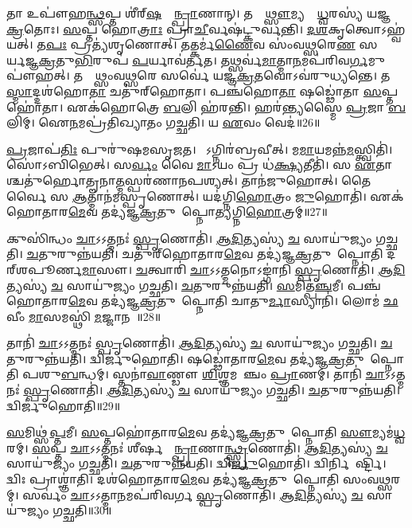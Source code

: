 𑌤𑌾 𑌉𑌪𑍗॑𑌹\ul{𑌨𑍍𑌥𑍍𑌸}𑌪𑍍𑌤 𑌶𑍀॑𑌰𑍍‌\mbox{}\ul{𑌷}𑌣𑍍𑌯𑌾᳚\ul{𑌨𑍍𑌪𑍍𑌰𑌾}𑌣𑌾𑌨𑍍।
𑌤𑌸𑍍𑌮𑌾᳚\ul{𑌥𑍍𑌸𑍗}𑌮𑍍𑌯𑌸𑍍𑌯𑌾᳚\ul{𑌧𑍍𑌵}𑌰𑌸𑍍𑌯॑ 𑌯𑌜𑍍𑌞\ul{𑌕𑍍𑌰}𑌤𑍋𑌃।
\ul{𑌸}𑌪𑍍𑌤 𑌹𑍋\ul{𑌤𑍍𑌰𑌾𑌃} 𑌪𑍍𑌰𑌾\ul{𑌚𑍀}𑌰𑍍𑌵𑌷॑𑌟𑍍𑌕𑍁𑌰𑍍𑌵𑌨𑍍𑌤𑌿।
\ul{𑌦}\ul{𑌶}𑌕𑍃𑌤𑍍𑌵𑍋\-𑌽𑌹𑍍𑌵॑𑌯𑌤𑍍।
𑌤\ul{𑌪𑌃} 𑌪𑍍𑌰𑌤𑍍𑌯॑𑌶𑍃𑌣𑍋𑌤𑍍।
𑌤𑌤𑍍𑌕𑌰𑍍𑌮॑\ul{𑌣𑍈}𑌵 𑌸𑌂॑𑌵\ul{𑌥𑍍𑌸}𑌰𑍇\ul{𑌣} 𑌸𑌰𑍍𑌵𑍈᳚𑌰𑍍𑌯𑌜𑍍𑌞\ul{𑌕𑍍𑌰}𑌤𑍁\ul{𑌭𑌿}𑌰𑍁𑌪॑ \ul{𑌪}𑌰𑍍𑌯𑌾𑌵॑𑌰𑍍𑌤𑌤।
𑌤𑌥𑍍𑌸𑌰𑍍𑌵॑\ul{𑌮𑌾}𑌤𑍍𑌮𑌾\ul{𑌨}𑌮𑌪॑𑌰𑌿𑌵\ul{𑌰𑍍𑌗}𑌮𑍁𑌪𑍗॑𑌹𑌤𑍍।
𑌤𑌸𑍍𑌮𑌾᳚𑌥𑍍𑌸𑌂𑌵\ul{𑌥𑍍𑌸}𑌰𑍇 𑌸𑌰𑍍𑌵𑍇॑ 𑌯𑌜𑍍𑌞\ul{𑌕𑍍𑌰}𑌤𑌵𑍋\-𑌽𑌵॑𑌰𑍁𑌧𑍍𑌯𑌨𑍍𑌤𑍇।
𑌤\ul{𑌸𑍍𑌮𑌾}𑌦𑍍𑌦𑌶॑𑌹𑍋\ul{𑌤𑌾} 𑌚𑌤𑍁॑𑌰𑍍‌\mbox{}𑌹𑍋𑌤𑌾।
𑌪𑌞𑍍𑌚॑𑌹𑍋\ul{𑌤𑌾} 𑌷𑌡𑍍𑌢𑍋॑𑌤𑌾 \ul{𑌸}𑌪𑍍𑌤𑌹𑍋॑𑌤𑌾।
𑌏𑌕॑𑌹𑍋𑌤𑍍𑌰𑍇 \ul{𑌬}𑌲𑌿 𑌹॑𑌰𑌨𑍍𑌤𑌿।
𑌹𑌰॑𑌨𑍍𑌤𑍍𑌯𑌸𑍍𑌮𑍈 \ul{𑌪𑍍𑌰}𑌜𑌾 \ul{𑌬}𑌲𑌿𑌮𑍍।
𑌐\ul{𑌨}𑌮𑌪𑍍𑌰॑𑌤𑌿𑌖𑍍𑌯𑌾𑌤𑌂 𑌗𑌚𑍍𑌛𑌤𑌿।
𑌯 \ul{𑌏}𑌵𑌂 𑌵𑍇𑌦॑॥26॥\anuvakamend[\ul{𑌚}𑌨𑍍𑌦𑍍𑌰𑌮𑌾᳚𑌶𑍍𑌚𑌾𑌤𑍁\ul{𑌰𑍍𑌮𑌾}𑌸𑍍𑌯𑌾𑌨𑌾𑌂᳚ 𑌯𑌜𑍍𑌞\ul{𑌕𑍍𑌰}𑌤𑍋𑌰॑\ul{𑌧𑍍𑌵}𑌰𑍇𑌣॑ 𑌯𑌜𑍍𑌞\ul{𑌕𑍍𑌰}𑌤𑍁𑌨𑍋𑌪॑ \ul{𑌪}𑌰𑍍𑌯𑌾𑌵॑𑌰𑍍𑌤𑌨𑍍𑌤 \ul{𑌸}𑌪𑍍𑌤𑌹𑍋॑𑌤𑌾 \ul{𑌚}𑌤𑍍𑌵𑌾𑌰𑌿॑ 𑌚]

\ul{𑌪𑍍𑌰}𑌜𑌾𑌪॑\ul{𑌤𑌿𑌃} 𑌪𑍁𑌰𑍁॑𑌷𑌮𑌸𑍃𑌜𑌤।
𑌸𑍋᳚𑌽𑌗𑍍𑌨𑌿𑌰॑𑌬𑍍𑌰𑌵𑍀𑌤𑍍।
𑌮\ul{𑌮𑌾}𑌯𑌮𑌨𑍍𑌨॑\-\ul{𑌮}𑌸𑍍𑌤𑍍𑌵𑌿𑌤𑌿॑।
𑌸𑍋॑𑌽𑌬𑌿𑌭𑍇𑌤𑍍।
𑌸\ul{𑌰𑍍𑌵𑌂} 𑌵𑍈 \ul{𑌮𑌾}𑌽𑌯𑌂 𑌪𑍍𑌰 𑌧॑\ul{𑌕𑍍𑌷𑍍𑌯}𑌤𑍀𑌤𑌿॑।
𑌸 \ul{𑌏}𑌤𑌾𑌶𑍍𑌚𑌤𑍁॑𑌰𑍍\mbox{}𑌹𑍋𑌤𑍄𑌨𑌾\ul{𑌤𑍍𑌮}𑌸𑍍𑌪𑌰॑𑌣𑌾𑌨𑌪𑌶𑍍𑌯𑌤𑍍।
𑌤𑌾𑌨॑𑌜𑍁𑌹𑍋𑌤𑍍।
𑌤𑍈𑌰𑍍𑌵𑍈 𑌸 \ul{𑌆}𑌤𑍍𑌮𑌾𑌨॑𑌮𑌸𑍍𑌪𑍃𑌣𑍋𑌤𑍍।
𑌯𑌦॑𑌗𑍍𑌨𑌿\ul{𑌹𑍋}𑌤𑍍𑌰𑌂 \ul{𑌜𑍁}𑌹𑍋𑌤𑌿॑।
𑌏𑌕॑𑌹𑍋𑌤𑌾𑌰\ul{𑌮𑍇}𑌵 𑌤𑌦𑍍𑌯॑𑌜𑍍𑌞\ul{𑌕𑍍𑌰}𑌤𑍁𑌮𑌾᳚𑌪𑍍𑌨𑍋𑌤𑍍𑌯𑌗𑍍𑌨𑌿\ul{𑌹𑍋}𑌤𑍍𑌰𑌮𑍍॥27॥

𑌕𑍁𑌸𑌿॑𑌨𑍍𑌧𑌂 \ul{𑌚𑌾}𑌽𑌽𑌤𑍍𑌮𑌨𑌃॑ \ul{𑌸𑍍𑌪𑍃}𑌣𑍋𑌤𑌿॑।
\ul{𑌆}\ul{𑌦𑌿}𑌤𑍍𑌯𑌸𑍍𑌯॑ \ul{𑌚} 𑌸𑌾𑌯𑍁॑𑌜𑍍𑌯𑌂 𑌗𑌚𑍍𑌛𑌤𑌿।
\ul{𑌚}𑌤𑍁𑌰𑍁𑌨𑍍𑌨॑𑌯𑌤𑌿।
𑌚𑌤𑍁॑𑌰𑍍‌\mbox{}𑌹𑍋𑌤𑌾𑌰\ul{𑌮𑍇}𑌵 𑌤𑌦𑍍𑌯॑𑌜𑍍𑌞\ul{𑌕𑍍𑌰}𑌤𑍁𑌮𑌾᳚𑌪𑍍𑌨𑍋𑌤𑌿 𑌦𑌰𑍍‌\mbox{}𑌶𑌪𑍂𑌰𑍍𑌣\ul{𑌮𑌾}𑌸𑍗।
\ul{𑌚}𑌤𑍍𑌵𑌾𑌰𑌿॑ \ul{𑌚𑌾}𑌽𑌽𑌤𑍍𑌮𑌨𑍋\-𑌽𑌙𑍍𑌗𑌾॑𑌨𑌿 \ul{𑌸𑍍𑌪𑍃}𑌣𑍋𑌤𑌿॑।
\ul{𑌆}\ul{𑌦𑌿}𑌤𑍍𑌯𑌸𑍍𑌯॑ \ul{𑌚} 𑌸𑌾𑌯𑍁॑𑌜𑍍𑌯𑌂 𑌗𑌚𑍍𑌛𑌤𑌿।
\ul{𑌚}𑌤𑍁𑌰𑍁𑌨𑍍𑌨॑𑌯𑌤𑌿।
\ul{𑌸}𑌮𑌿𑌤𑍍𑌪॑\ul{𑌞𑍍𑌚}𑌮𑍀।
𑌪𑌞𑍍𑌚॑𑌹𑍋𑌤𑌾𑌰\ul{𑌮𑍇}𑌵 𑌤𑌦𑍍𑌯॑𑌜𑍍𑌞\ul{𑌕𑍍𑌰}𑌤𑍁𑌮𑌾᳚𑌪𑍍𑌨𑍋𑌤𑌿 𑌚𑌾𑌤𑍁\ul{𑌰𑍍𑌮𑌾}𑌸𑍍𑌯𑌾𑌨𑌿॑।
𑌲𑍋𑌮॑ \ul{𑌛}𑌵𑍀𑌂 \ul{𑌮𑌾}\ul{}𑌸𑌮𑌸𑍍𑌥𑌿॑ \ul{𑌮}𑌜𑍍𑌜𑌾𑌨𑌮𑍍᳚॥28॥

𑌤𑌾𑌨𑌿॑ \ul{𑌚𑌾}𑌽𑌽𑌤𑍍𑌮𑌨𑌃॑ \ul{𑌸𑍍𑌪𑍃}𑌣𑍋𑌤𑌿॑।
\ul{𑌆}\ul{𑌦𑌿}𑌤𑍍𑌯𑌸𑍍𑌯॑ \ul{𑌚} 𑌸𑌾𑌯𑍁॑𑌜𑍍𑌯𑌂 𑌗𑌚𑍍𑌛𑌤𑌿।
\ul{𑌚}𑌤𑍁𑌰𑍁𑌨𑍍𑌨॑𑌯𑌤𑌿।
𑌦𑍍𑌵𑌿𑌰𑍍𑌜𑍁॑𑌹𑍋𑌤𑌿।
𑌷𑌡𑍍𑌢𑍋॑𑌤𑌾𑌰\ul{𑌮𑍇}𑌵 𑌤𑌦𑍍𑌯॑𑌜𑍍𑌞\ul{𑌕𑍍𑌰}𑌤𑍁𑌮𑌾᳚𑌪𑍍𑌨𑍋𑌤𑌿 𑌪𑌶𑍁\ul{𑌬}𑌨𑍍𑌧𑌮𑍍।
𑌸𑍍𑌤𑌨𑌾॑\ul{𑌵𑌾}𑌣𑍍𑌡𑍗 \ul{𑌶𑌿}𑌶𑍍𑌞𑌮𑌵𑌾᳚𑌞𑍍𑌚𑌂 \ul{𑌪𑍍𑌰𑌾}𑌣𑌮𑍍।
𑌤𑌾𑌨𑌿॑ \ul{𑌚𑌾}𑌽𑌽𑌤𑍍𑌮𑌨𑌃॑ \ul{𑌸𑍍𑌪𑍃}𑌣𑍋𑌤𑌿॑।
\ul{𑌆}\ul{𑌦𑌿}𑌤𑍍𑌯𑌸𑍍𑌯॑ \ul{𑌚} 𑌸𑌾𑌯𑍁॑𑌜𑍍𑌯𑌂 𑌗𑌚𑍍𑌛𑌤𑌿।
\ul{𑌚}𑌤𑍁𑌰𑍁𑌨𑍍𑌨॑𑌯𑌤𑌿।
𑌦𑍍𑌵𑌿𑌰𑍍𑌜𑍁॑𑌹𑍋𑌤𑌿॥29॥

\ul{𑌸}𑌮𑌿𑌥𑍍𑌸॑\ul{𑌪𑍍𑌤}𑌮𑍀।
\ul{𑌸}𑌪𑍍𑌤𑌹𑍋॑𑌤𑌾𑌰\ul{𑌮𑍇}𑌵 𑌤𑌦𑍍𑌯॑𑌜𑍍𑌞\ul{𑌕𑍍𑌰}𑌤𑍁𑌮𑌾᳚𑌪𑍍𑌨𑍋𑌤𑌿 \ul{𑌸𑍗}𑌮𑍍𑌯𑌮॑\ul{𑌧𑍍𑌵}𑌰𑌮𑍍।
\ul{𑌸}𑌪𑍍𑌤 \ul{𑌚𑌾}𑌽𑌽𑌤𑍍𑌮𑌨𑌃॑ 𑌶𑍀𑌰𑍍\mbox{}\ul{𑌷}𑌣𑍍𑌯𑌾᳚\ul{𑌨𑍍𑌪𑍍𑌰𑌾}𑌣𑌾\ul{𑌨𑍍𑌥𑍍𑌸𑍍𑌪𑍃}𑌣𑍋𑌤𑌿॑।
\ul{𑌆}\ul{𑌦𑌿}𑌤𑍍𑌯𑌸𑍍𑌯॑ \ul{𑌚} 𑌸𑌾𑌯𑍁॑𑌜𑍍𑌯𑌂 𑌗𑌚𑍍𑌛𑌤𑌿।
\ul{𑌚}𑌤𑍁𑌰𑍁𑌨𑍍𑌨॑𑌯𑌤𑌿।
𑌦𑍍𑌵𑌿\ul{𑌰𑍍𑌜𑍁}𑌹𑍋𑌤𑌿॑।
𑌦𑍍𑌵𑌿𑌰𑍍𑌨𑌿𑌮𑌾᳚𑌰𑍍𑌷𑍍𑌟𑌿।
𑌦𑍍𑌵𑌿𑌃 𑌪𑍍𑌰𑌾𑌶𑍍𑌞𑌾॑𑌤𑌿।
𑌦𑌶॑𑌹𑍋𑌤𑌾𑌰\ul{𑌮𑍇}𑌵 𑌤𑌦𑍍𑌯॑𑌜𑍍𑌞\ul{𑌕𑍍𑌰}𑌤𑍁𑌮𑌾᳚𑌪𑍍𑌨𑍋𑌤𑌿 𑌸𑌂𑌵\ul{𑌥𑍍𑌸}𑌰𑌮𑍍।
𑌸𑌰𑍍𑌵𑌂॑ \ul{𑌚𑌾}𑌽𑌽𑌤𑍍𑌮𑌾\ul{𑌨}𑌮𑌪॑𑌰𑌿𑌵𑌰𑍍𑌗 \ul{𑌸𑍍𑌪𑍃}𑌣𑍋𑌤𑌿॑।
\ul{𑌆}\ul{𑌦𑌿}𑌤𑍍𑌯𑌸𑍍𑌯॑ \ul{𑌚} 𑌸𑌾𑌯𑍁॑𑌜𑍍𑌯𑌂 𑌗𑌚𑍍𑌛𑌤𑌿॥30॥\anuvakamend[\ul{𑌅}\ul{𑌗𑍍𑌨𑌿}\ul{𑌹𑍋}𑌤𑍍𑌰𑌂 \ul{𑌮}𑌜𑍍𑌜𑌾\ul{𑌨}𑌨𑍍𑌦𑍍𑌵𑌿𑌰𑍍𑌜𑍁॑\ul{𑌹𑍋}𑌤𑍍𑌯𑌪॑𑌰𑌿𑌵𑌰𑍍𑌗\dng{ꣴ} \ul{𑌸𑍍𑌪𑍃}𑌣𑍋𑌤𑍍𑌯𑍇𑌕𑌂॑ 𑌚]


